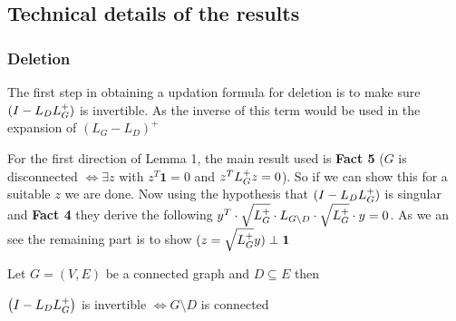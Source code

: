 \subsection{Technical details of the results}

\subsubsection{Deletion}
The first step in obtaining a updation formula for deletion is to make sure $(I - L_D L_{G}^{+})$ is invertible. As the inverse of this term would be used in the expansion of $(L_G - L_D)^+$


For the first direction of Lemma 1, the main result used is \textbf{Fact 5} ($G$ is disconnected $\iff \exists z$ with $z^T \textbf{1} = 0$ and $z^T L_{G}^{+} z = 0$). So if we can show this for a suitable $z$ we are done. Now using the hypothesis that $(I - L_D L_{G}^{+})$ is singular and \textbf{Fact 4} they derive the following $ y^T \cdot \sqrt{L_{G}^{+}} \cdot L_{G \setminus D} \cdot \sqrt{L_{G}^{+}} \cdot y = 0$. As we an see the remaining part is to show $(z = \sqrt{L_{G}^{+}} y) \perp \textbf{1}$


\begin{HXl}
  Let $G=(V,E)$ be a connected graph and $D \subseteq E$ then  
  
  $\left( I - L_D L_{G}^{+} \right)$ is invertible $\iff G \setminus D$ is connected 
  
\end{HXl}

